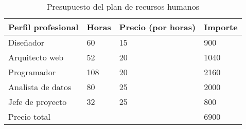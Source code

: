 \begin{table}[]
	\centering
	\begin{tabular}{llll}
		\textbf{Perfil profesional} & \textbf{Horas} & \textbf{Precio (por horas)} & \textbf{Importe} \\ \hline
		Diseñador                   & 60            & 15                          & 900             \\
		Arquitecto web              & 52            & 20                          & 1040             \\
		Programador                 & 108            & 20                          & 2160             \\
		Analista de datos           & 80            & 25                          & 2000             \\
		Jefe de proyecto            & 32            & 25                          & 800             \\
		\hline Precio total                &                &                     & 6900
	\end{tabular}
	\caption{Presupuesto del plan de recursos humanos}
	\label{precios}
\end{table}
